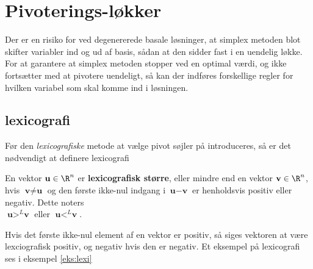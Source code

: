 \section{Pivoterings-løkker}
 Der er en risiko for ved degenererede basale løsninger, at simplex metoden blot skifter variabler ind og ud af basis, sådan at den sidder fast i en uendelig løkke.  
For at garantere at simplex metoden stopper ved en optimal værdi, og ikke fortsætter med at pivotere uendeligt, så kan der indføres forskellige regler for hvilken variabel som skal komme ind i løsningen.

\subsection{lexicografi}

Før den \textit{lexicografiske} metode at vælge pivot søjler på introduceres, så er det nødvendigt at definere lexicografi
\begin{defn}{}{}
En vektor $\textbf{u}\in \R^n$ er \textbf{lexicografisk større}, eller mindre end en vektor $\textbf{v}\in \R^n$, hvis $\textbf{v} \neq \textbf{u}$ og den første ikke-nul indgang i $\textbf{u}-\textbf{v}$ er henholdsvis positiv eller negativ. Dette noters\\
\center
$\textbf{u} >^L \textbf{v}$ eller $\textbf{u} <^L \textbf{v}$. 
\end{defn}
\noindent
Hvis det første ikke-nul element af en vektor er positiv, så siges vektoren at være lexciografisk positiv, og negativ hvis den er negativ. Et eksempel på lexicografi ses i eksempel \ref{eks:lexi}

